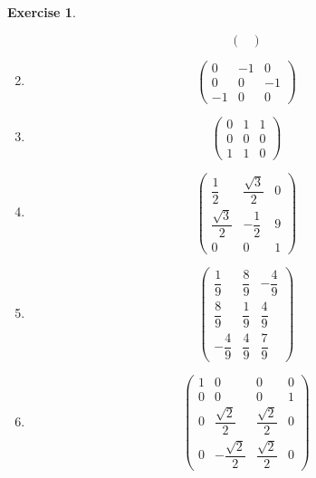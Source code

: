 \documentclass{article}
\theoremstyle{plain}
\theoremstyle{definition}
\newtheorem{xca}[exmp]{Exercise}
\theoremstyle{remark}
\begin{document}
\begin{bxthm}
\begin{xca}
\begin{multicols}{2}
\begin{enumerate}
\[\begin{pmatrix}
            \end{pmatrix}\]
            \item \[\begin{pmatrix}
                0&-1&0\\
                0&0&-1\\
                -1&0&0
            \end{pmatrix}\]
            \item \[\begin{pmatrix}
                0&1&1\\
                0&0&0\\
                1&1&0
            \end{pmatrix}\]
            \item \[\begin{pmatrix}
                \dfrac{1}{2}&\dfrac{\sqrt{3}}{2}&0\\
                \dfrac{\sqrt{3}}{2}&-\dfrac{1}{2}&9\\
                0&0&1
            \end{pmatrix}\]
            \item \[\begin{pmatrix}
                \dfrac{1}{9}&\dfrac{8}{9}&-\dfrac{4}{9}\\
                \dfrac{8}{9}&\dfrac{1}{9}&\dfrac{4}{9}\\
                -\dfrac{4}{9}&\dfrac{4}{9}&\dfrac{7}{9}
            \end{pmatrix}\]
            \item \[\begin{pmatrix}
                1&0&0&0\\
                0&0&0&1\\
                0&\dfrac{\sqrt{2}}{2}&\dfrac{\sqrt{2}}{2}&0\\
                0&-\dfrac{\sqrt{2}}{2}&\dfrac{\sqrt{2}}{2}&0
            \end{pmatrix}\]
        \end{enumerate}    
    \end{multicols}
\end{xca}
\end{bxthm}

\vspace{10pt}
\end{document}
